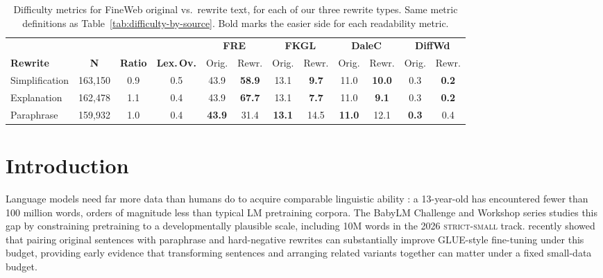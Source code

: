 \documentclass[11pt]{article}
\begin{document}
\begin{table}[t]
\centering
\small
\begin{tabular}{lccccccccccc}
\toprule
& & & & \multicolumn{2}{c}{\textbf{FRE}} & \multicolumn{2}{c}{\textbf{FKGL}} & \multicolumn{2}{c}{\textbf{DaleC}} & \multicolumn{2}{c}{\textbf{DiffWd}} \\
\textbf{Rewrite} & \textbf{N} & \textbf{Ratio} & \textbf{Lex.\,Ov.} & Orig. & Rewr. & Orig. & Rewr. & Orig. & Rewr. & Orig. & Rewr. \\
\midrule
Simplification & 163{,}150 & 0.9 & 0.5 & 43.9 & \textbf{58.9} & 13.1 & \textbf{9.7} & 11.0 & \textbf{10.0} & 0.3 & \textbf{0.2} \\
Explanation & 162{,}478 & 1.1 & 0.4 & 43.9 & \textbf{67.7} & 13.1 & \textbf{7.7} & 11.0 & \textbf{9.1} & 0.3 & \textbf{0.2} \\
Paraphrase & 159{,}932 & 1.0 & 0.4 & \textbf{43.9} & 31.4 & \textbf{13.1} & 14.5 & \textbf{11.0} & 12.1 & \textbf{0.3} & 0.4 \\
\bottomrule
\end{tabular}
\caption{Difficulty metrics for FineWeb original vs.\ rewrite text, for each of our three rewrite types. Same metric definitions as Table~\ref{tab:difficulty-by-source}. Bold marks the easier side for each readability metric.}
\label{tab:difficulty-paraphrase}
\end{table}

\section{Introduction}
\label{sec:introduction}


Language models need far more data than humans do to acquire comparable linguistic ability \citep{warstadt2022artificial}: a 13-year-old has encountered fewer than 100 million words, orders of magnitude less than typical LM pretraining corpora. The BabyLM Challenge and Workshop series \citep{warstadt2023findings,choshen2024call,charpentier2025findings,babylm2026cfp} studies this gap by constraining pretraining to a developmentally plausible scale, including 10M words in the 2026 \textsc{strict-small} track. \citet{edman2024babylms} recently showed that pairing original sentences with paraphrase and hard-negative rewrites can substantially improve GLUE-style fine-tuning under this budget, providing early evidence that transforming sentences and arranging related variants together can matter under a fixed small-data budget.
\end{document}
